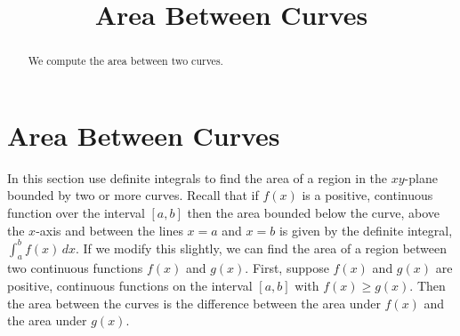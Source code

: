 \documentclass{ximera}
\title{Area Between Curves}
\begin{document}
\begin{abstract}
We compute the area between two curves.
\end{abstract}

\maketitle

\section{Area Between Curves}

In this section use definite integrals to find the area of a region 
in the $xy$-plane bounded by two or more curves. Recall that if $f(x)$ is a positive, continuous function 
over the interval $[a, b]$ then the area bounded below the curve, above the $x$-axis and between the lines $x = a$
and $x = b$ is given by the definite integral, $\int_a^b f(x) \, dx$. If we modify this slightly, 
we can find the area of a region between two continuous functions $f(x)$ and $g(x)$. First, suppose $f(x)$ and $g(x)$
are positive, continuous functions on the interval $[a,b]$ with $f(x) \geq g(x)$.
Then the area between the curves is the difference between the area under $f(x)$ and the area under $g(x)$.


\begin{center}
\end{center}
\end{document}
